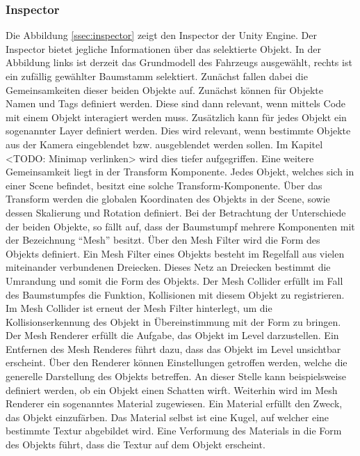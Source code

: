 \subsubsection{Inspector}
Die Abbildung \ref{ssec:inspector} zeigt den Inspector der Unity Engine. Der Inspector bietet jegliche Informationen über das selektierte Objekt. In der Abbildung links ist derzeit das Grundmodell des Fahrzeugs ausgewählt, rechts ist ein zufällig gewählter Baumstamm selektiert.
Zunächst fallen dabei die Gemeinsamkeiten dieser beiden Objekte auf. Zunächst können für Objekte Namen und Tags definiert werden. Diese sind dann relevant, wenn mittels Code mit einem Objekt interagiert werden muss. Zusätzlich kann für jedes Objekt ein sogenannter Layer definiert werden. Dies wird relevant, wenn bestimmte Objekte aus der Kamera eingeblendet bzw. ausgeblendet werden sollen. Im Kapitel <TODO: Minimap verlinken> wird dies tiefer aufgegriffen. Eine weitere Gemeinsamkeit liegt in der Transform Komponente. Jedes Objekt, welches sich in einer Scene befindet, besitzt eine solche Transform-Komponente. Über das Transform werden die globalen Koordinaten des Objekts in der Scene, sowie dessen Skalierung und Rotation definiert. 
Bei der Betrachtung der Unterschiede der beiden Objekte, so fällt auf, dass der Baumstumpf mehrere Komponenten mit der Bezeichnung \enquote{Mesh} besitzt.
Über den Mesh Filter wird die Form des Objekts definiert. Ein Mesh Filter eines Objekts besteht im Regelfall aus vielen miteinander verbundenen Dreiecken. Dieses Netz an Dreiecken bestimmt die Umrandung und somit die Form des Objekts. 
Der Mesh Collider erfüllt im Fall des Baumstumpfes die Funktion, Kollisionen mit diesem Objekt zu registrieren. Im Mesh Collider ist erneut der Mesh Filter hinterlegt, um die Kollisionserkennung des Objekt in Übereinstimmung mit der Form zu bringen. 
Der Mesh Renderer erfüllt die Aufgabe, das Objekt im Level darzustellen. Ein Entfernen des Mesh Renderes führt dazu, dass das Objekt im Level unsichtbar erscheint. Über den Renderer können Einstellungen getroffen werden, welche die generelle Darstellung des Objekts betreffen. An dieser Stelle kann beispielsweise definiert werden, ob ein Objekt einen Schatten wirft. Weiterhin wird im Mesh Renderer ein sogenanntes Material zugewiesen. Ein Material erfüllt den Zweck, das Objekt einzufärben. Das Material selbst ist eine Kugel, auf welcher eine bestimmte Textur abgebildet wird. Eine Verformung des Materials in die Form des Objekts führt, dass die Textur auf dem Objekt erscheint.

